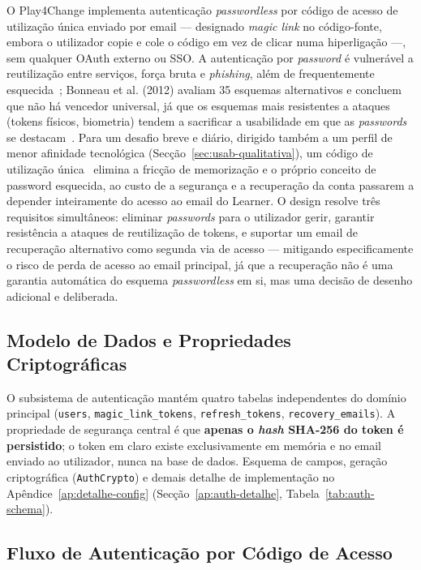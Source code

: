 O Play4Change implementa autenticação \textit{passwordless} por código de acesso de utilização única enviado por email --- designado \textit{magic link} no código-fonte, embora o utilizador copie e cole o código em vez de clicar numa hiperligação ---, sem qualquer OAuth externo ou SSO. A autenticação por \textit{password} é vulnerável a reutilização entre serviços, força bruta e \textit{phishing}, além de frequentemente esquecida~\cite{bonneau2012}; Bonneau et al. (2012) avaliam 35 esquemas alternativos e concluem que não há vencedor universal, já que os esquemas mais resistentes a ataques (tokens físicos, biometria) tendem a sacrificar a usabilidade em que as \textit{passwords} se destacam~\cite{bonneau2012}. Para um desafio breve e diário, dirigido também a um perfil de menor afinidade tecnológica (Secção~\ref{sec:usab-qualitativa}), um código de utilização única~\cite{fido2019} elimina a fricção de memorização e o próprio conceito de password esquecida, ao custo de a segurança e a recuperação da conta passarem a depender inteiramente do acesso ao email do Learner.
O design resolve três requisitos simultâneos: eliminar \textit{passwords} para o utilizador gerir, garantir resistência a ataques de reutilização de tokens, e suportar um email de recuperação alternativo como segunda via de acesso --- mitigando especificamente o risco de perda de acesso ao email principal, já que a recuperação não é uma garantia automática do esquema \textit{passwordless} em si, mas uma decisão de desenho adicional e deliberada.

\subsection{Modelo de Dados e Propriedades Criptográficas} \label{sec:auth-model}

O subsistema de autenticação mantém quatro tabelas independentes do domínio principal (\texttt{users}, \texttt{magic\_link\_tokens}, \texttt{refresh\_tokens}, \texttt{recovery\_emails}). A propriedade de segurança central é que \textbf{apenas o \textit{hash} SHA-256 do token é persistido}; o token em claro existe exclusivamente em memória e no email enviado ao utilizador, nunca na base de dados. Esquema de campos, geração criptográfica (\texttt{AuthCrypto}) e demais detalhe de implementação no Apêndice~\ref{ap:detalhe-config} (Secção~\ref{ap:auth-detalhe}, Tabela~\ref{tab:auth-schema}).

\subsection{Fluxo de Autenticação por Código de Acesso} \label{sec:auth-flow}

